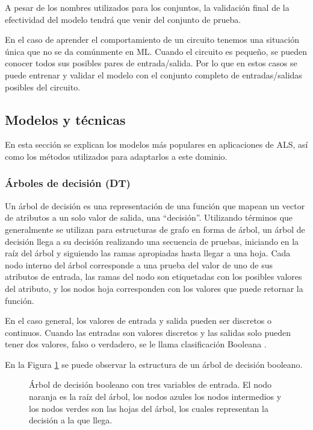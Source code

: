 A pesar de los nombres utilizados para los conjuntos, la validación final de la
efectividad del modelo tendrá que venir del conjunto de prueba.

En el caso de aprender el comportamiento de un circuito tenemos una situación
única que no se da comúnmente en ML. Cuando el circuito es pequeño, se pueden
conocer todos sus posibles pares de entrada/salida. Por lo que en estos casos
se puede entrenar y validar el modelo con el conjunto completo de
entradas/salidas posibles del circuito.

\subsection{Modelos y técnicas}

En esta sección se explican los modelos más populares en aplicaciones de ALS,
así como los métodos utilizados para adaptarlos a este dominio.

\subsubsection{Árboles de decisión (DT)}

Un árbol de decisión es una representación de una función que mapean un vector
de atributos a un solo valor de salida, una ``decisión''. Utilizando términos
que generalmente se utilizan para estructuras de grafo en forma de árbol, un
árbol de decisión llega a su decisión realizando una secuencia de pruebas,
iniciando en la raíz del árbol y siguiendo las ramas apropiadas hasta llegar a
una hoja. Cada nodo interno del árbol corresponde a una prueba del valor de uno
de sus atributos de entrada, las ramas del nodo son etiquetadas con los
posibles valores del atributo, y los nodos hoja corresponden con los valores
que puede retornar la función.

En el caso general, los valores de entrada y salida pueden ser discretos o
continuos. Cuando las entradas son valores discretos y las salidas solo pueden
tener dos valores, falso o verdadero, se le llama clasificación Booleana
\cite{russell2016artificial}.

En la Figura \ref{fig:DT} se puede observar la estructura de un árbol de
decisión booleano.

\begin{figure}[htb]
  \centering
  
  \caption{Árbol de decisión booleano con tres variables de entrada. El nodo
    naranja es la raíz del árbol, los nodos azules los nodos intermedios y los
    nodos verdes son las hojas del árbol, los cuales representan la decisión a la
  que llega.}
  \label{fig:DT}
\end{figure}

